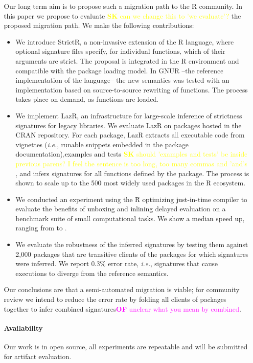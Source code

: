\documentclass[review,nonacm,screen,acmsmall,anonymous=true]{acmart}
\newcommand{\authorcomment}[3]{\xspace\textcolor{#1}{{\bf #2} #3}\xspace}
\newcommand{\SK}[1]{\authorcomment{yellow}{SK}{#1}}
\newcommand{\OF}[1]{\authorcomment{magenta}{OF}{#1}}
\newcommand{\strictr}{{\sf StrictR}\xspace}
\newcommand{\lazr}{{\sf LazR}\xspace}
\renewcommand{\Rsh}{{\sf\u R}\xspace}
\newcommand{\ie}{\emph{i.e.},\xspace}
\begin{document}
Our long term aim is to propose such a migration path to the R community. In
this paper we propose to evaluate \SK{can we change this to 'we evaluate'?}  
the proposed migration path. We make the following contributions:

\begin{itemize}
\item We introduce \strictr, a non-invasive extension of the R language, where
  optional signature files specify, for individual functions, which of their
  arguments are strict. The proposal is integrated in the R environment and
  compatible with the package loading model. In GNUR –the reference
  implementation of the language– the new semantics was tested with an
  implementation based on source-to-source rewriting of functions. The process 
  takes place on demand, as functions are loaded.
\item We implement \lazr, an infrastructure for large-scale inference of
  strictness signatures for legacy libraries. We evaluate \lazr on packages
  hosted in the CRAN repository. For each package, \lazr extracts all executable
  code from vignettes (\ie runable snippets embedded in the package
  documentation),examples and tests 
  \SK{should 'examples and tests' be inside previous parens? I feel the sentence 
  is too long, too many commas and 'and's} , and infers signatures for all
  functions defined by the package. The process is shown to scale up to the 500
  most widely used packages in the R ecosystem.
\item We conducted an experiment using the \Rsh optimizing just-in-time compiler
  to evaluate the benefits of unboxing and inlining
  delayed evaluation on a benchmark suite of small computational tasks. We show
  a median \speedupRshStrict speed up, ranging from \speedupRshStrictMin to \speedupRshStrictMax.
\item We evaluate the robustness of the inferred signatures by testing them against
  2,000 packages that are transitive clients of the packages for which
  signatures were inferred. We report 0.3\% error rate, \ie signatures
  that cause executions to diverge from the reference semantics.
\end{itemize}

Our conclusions are that a semi-automated migration is viable; for community
review we intend to reduce the error rate by folding all clients of packages
together to infer combined signatures\OF{unclear what you mean by combined}.

\paragraph{Availability} Our work is in open source, all experiments are
repeatable and will be submitted for artifact evaluation.
\end{document}
